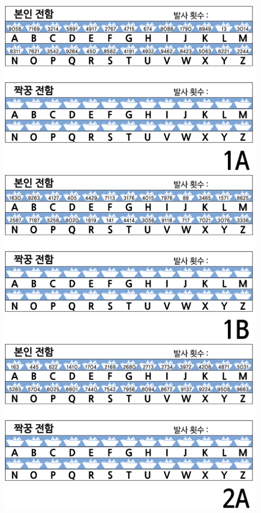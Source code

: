\documentclass[]{article}
\begin{document}
\includegraphics{csunplugged/02-part/img/ch06-search/06-search-01-battleship-1A.png}
\includegraphics{csunplugged/02-part/img/ch06-search/06-search-01-battleship-1B.png}
\includegraphics{csunplugged/02-part/img/ch06-search/06-search-01-battleship-2A.png}
\end{document}
